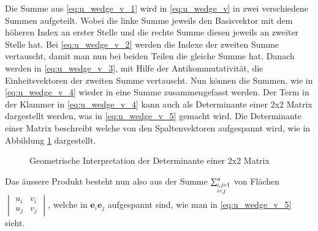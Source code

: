 Die Summe aus \ref{eq:u_wedge_v_1} wird in \ref{eq:u_wedge_v} in zwei verschiedene Summen aufgeteilt. 
Wobei die linke Summe jeweils den Basisvektor mit dem höheren Index an erster Stelle und die rechte Summe diesen jeweils an zweiter Stelle hat. 
\newline
Bei \ref{eq:u_wedge_v_2} werden die Indexe der zweiten Summe vertauscht, damit man nun bei beiden Teilen die gleiche Summe hat.
Danach werden in \ref{eq:u_wedge_v_3}, mit Hilfe der Antikommutativität, die Einheitsvektoren der zweiten Summe vertauscht.
\newline
Nun können die Summen, wie in \ref{eq:u_wedge_v_4} wieder in eine Summe zusammengefasst werden.
\newline
Der Term in der Klammer in \ref{eq:u_wedge_v_4} kann auch als Determinante einer 2x2 Matrix dargestellt werden, was in \ref{eq:u_wedge_v_5} gemacht wird.
\newline
Die Determinante einer Matrix beschreibt welche von den Spaltenvektoren aufgespannt wird, wie in Abbildung \ref{figure:det} dargestellt.
\begin{figure}
\centering
{}
\caption{Geometrische Interpretation der Determinante einer 2x2 Matrix\label{figure:det}}
\end{figure}
\newline
Das äussere Produkt besteht nun also aus der Summe 
    $\sum_{\begin{subarray}{l}i,j=1\\i < j\end{subarray}}^n$
    von Flächen 
    $\begin{vmatrix} 
        u_i & v_i \\
        u_j & v_j
    \end{vmatrix}$, welche in $\textbf{e}_i\textbf{e}_j$ aufgespannt sind, wie man in \ref{eq:u_wedge_v_5} sieht. 
